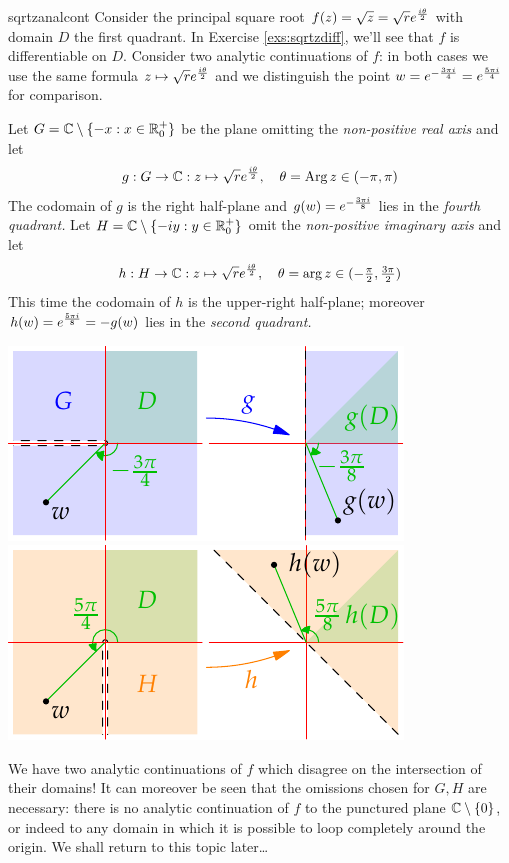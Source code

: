 \begin{example}{}{sqrtzanalcont}
Consider the principal square root $f(z)=\sqrt z=\sqrt re^{\frac{i\theta}{2}}$ with domain $D$ the first quadrant. In Exercise \ref{exs:sqrtzdiff}, we'll see that $f$ is differentiable on $D$.\smallbreak
Consider two analytic continuations of $f$: in both cases we use the same formula $z\mapsto\sqrt re^{\frac{i\theta}{2}}$ and we distinguish the point $w=e^{-\frac{3\pi i}{4}}=e^{\frac{5\pi i}{4}}$ for comparison.\par
\begin{minipage}[t]{0.59\linewidth}\vspace{-5pt}
Let $G=\mathbb{C}\setminus\{-x:x\in\mathbb{R}^+_0\}$ be the plane omitting the \emph{non-positive real axis} and let
\[g:G\to\mathbb{C}:z\mapsto \sqrt re^{\frac{i\theta}{2}},\quad \theta=\operatorname{Arg} z\in(-\pi,\pi)\]
The codomain of $g$ is the right half-plane and $g(w)=e^{-\frac{3\pi i}{8}}$ lies in the \emph{fourth quadrant.}\medbreak
Let $H=\mathbb{C}\setminus\{-iy:y\in\mathbb{R}^+_0\}$ omit the \emph{non-positive imaginary axis} and let
\[h:H\to\mathbb{C}:z\mapsto \sqrt re^{\frac{i\theta}{2}},\quad \theta=\arg z\in(-\tfrac\pi 2,\tfrac{3\pi}2)\]
This time the codomain of $h$ is the upper-right half-plane; moreover $h(w)=e^{\frac{5\pi i}{8}}=-g(w)$ lies in the \emph{second quadrant.}
\end{minipage}\begin{minipage}[t]{0.41\linewidth}\vspace{-15pt}
\flushright\includegraphics{analytic-cont1}\\
\includegraphics{analytic-cont2}
\end{minipage}\smallbreak
We have two analytic continuations of $f$ which disagree on the intersection of their domains!\smallbreak
It can moreover be seen that the omissions chosen for $G,H$ are necessary: there is no analytic continuation of $f$ to the punctured plane $\mathbb{C}\setminus\{0\}$, or indeed to any domain in which it is possible to loop completely around the origin. We shall return to this topic later\ldots
\end{example}
\goodbreak

